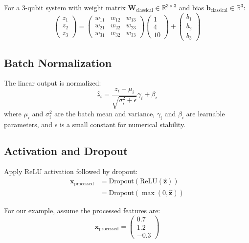 \documentclass[12pt]{article}
\begin{document}
For a 3-qubit system with weight matrix $\mathbf{W}_{\text{classical}} \in \mathbb{R}^{3 \times 3}$ and bias $\mathbf{b}_{\text{classical}} \in \mathbb{R}^3$:
\begin{equation}
\begin{pmatrix} z_1 \\ z_2 \\ z_3 \end{pmatrix} = 
\begin{pmatrix} 
w_{11} & w_{12} & w_{13} \\
w_{21} & w_{22} & w_{23} \\
w_{31} & w_{32} & w_{33}
\end{pmatrix}
\begin{pmatrix} 1 \\ 4 \\ 10 \end{pmatrix} +
\begin{pmatrix} b_1 \\ b_2 \\ b_3 \end{pmatrix}
\end{equation}

\subsection{Batch Normalization}
The linear output is normalized:
\begin{equation}
\hat{z}_i = \frac{z_i - \mu_i}{\sqrt{\sigma_i^2 + \epsilon}} \gamma_i + \beta_i
\end{equation}
where $\mu_i$ and $\sigma_i^2$ are the batch mean and variance, $\gamma_i$ and $\beta_i$ are learnable parameters, and $\epsilon$ is a small constant for numerical stability.

\subsection{Activation and Dropout}
Apply ReLU activation followed by dropout:
\begin{align}
\mathbf{x}_{\text{processed}} &= \text{Dropout}(\text{ReLU}(\hat{\mathbf{z}})) \\
&= \text{Dropout}(\max(0, \hat{\mathbf{z}}))
\end{align}

For our example, assume the processed features are:
\begin{equation}
\mathbf{x}_{\text{processed}} = \begin{pmatrix} 0.7 \\ 1.2 \\ -0.3 \end{pmatrix}
\end{equation}
\end{document}
